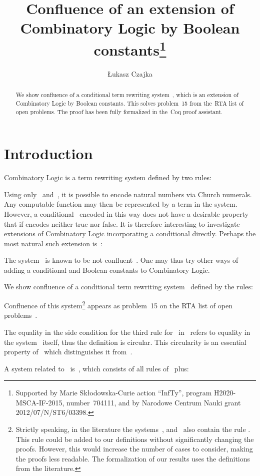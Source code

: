 \documentclass[a4paper,UKenglish]{lipics-v2016}
\title{Confluence of an extension of Combinatory Logic by Boolean
  constants\footnote{Supported by Marie Sk{\l}odowska-Curie action ``InfTy'',
    program H2020-MSCA-IF-2015, number~704111, and by Narodowe Centrum
    Nauki grant 2012/07/N/ST6/03398.}}
\author[1]{{\L}ukasz Czajka}
\affil[1]{DIKU, University of Copenhagen, Copenhagen, Denmark\\
  \texttt{luta@di.ku.dk}}
\begin{document}
\maketitle

\begin{abstract}
  We show confluence of a conditional term rewriting system~,
  which is an extension of Combinatory Logic by Boolean
  constants. This solves problem~15 from the~RTA list of open
  problems. The proof has been fully formalized in the~Coq proof
  assistant.
\end{abstract}

\section{Introduction}

Combinatory Logic is a term rewriting system defined by two rules:

Using only~ and~, it is possible to encode natural numbers via
Church numerals. Any computable function may then be represented by a
term in the system. However, a conditional~ encoded in this way
does not have a desirable property that  if 
encodes neither true nor false. It is therefore interesting to
investigate extensions of Combinatory Logic incorporating a
conditional directly. Perhaps the most natural such extension
is~:

The system~ is known to be not confluent~\cite{Klop1980}. One
may thus try other ways of adding a conditional and Boolean constants
to Combinatory Logic.

We show confluence of a conditional term rewriting system~
defined by the rules:

Confluence of this system\footnote{Strictly speaking, in the
  literature the systems~,  and~ also contain the
  rule . This rule could be added to our definitions
  without significantly changing the proofs. However, this would
  increase the number of cases to consider, making the proofs less
  readable. The formalization of our results uses the definitions from
  the literature.} appears as problem~15 on the RTA list of open
problems~\cite{DershowitzJouannaudKlop1991}.

The equality in the side condition for the third rule for~
in~ refers to equality in the system~ itself, thus the
definition is circular. This circularity is an essential property
of~ which distinguishes it from~.

A system related to~ is~, which consists of all rules
of~ plus:
\end{document}
